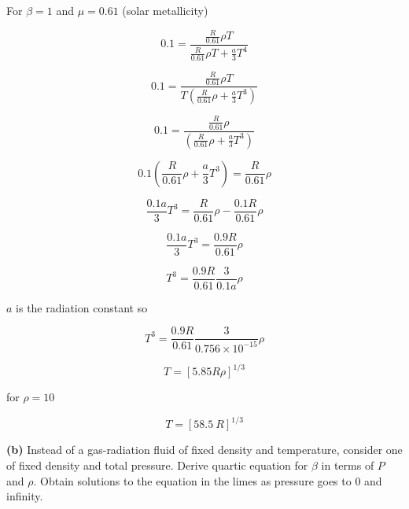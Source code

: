 \documentclass[12pt]{article}
\begin{document}
\noindent For $\beta = 1$ and $\mu = 0.61$ (solar metallicity)

\begin{equation}
0.1 =  \frac{\frac{R}{0.61}\rho T}{  \frac{R}{0.61}\rho T +   \frac{a}{3}T^4 }
\end{equation}

\begin{equation}
0.1 =  \frac{\frac{R}{0.61}\rho T}{  T\left ( \frac{R}{0.61}\rho +   \frac{a}{3}T^3 \right) }
\end{equation}

\begin{equation}
0.1 =  \frac{\frac{R}{0.61}\rho}{ \left ( \frac{R}{0.61}\rho +   \frac{a}{3}T^3 \right) }
\end{equation}


\begin{equation}
0.1 \left ( \frac{R}{0.61}\rho +   \frac{a}{3}T^3 \right)  =  \frac{R}{0.61}\rho
\end{equation}

\begin{equation}
\frac{0.1a}{3}T^3  =  \frac{R}{0.61}\rho - \frac{0.1R}{0.61}\rho
\end{equation}


\begin{equation}
\frac{0.1a}{3}T^3  =  \frac{0.9R}{0.61}\rho 
\end{equation}

\begin{equation}
T^3  =  \frac{0.9R}{0.61}\frac{3}{0.1a}\rho 
\end{equation}

\noindent $a$ is the radiation constant so 


\begin{equation}
T^3  =  \frac{0.9R}{0.61}\frac{3}{0.756 \times 10^{-15}}\rho 
\end{equation}


\begin{equation}
T =  \left[ 5.85 R\rho \right]^{1/3} 
\end{equation}

\noindent for $\rho = 10 $

\begin{equation}
T =  \left[ 58.5 ~R  \right]^{1/3} 
\end{equation}

\noindent \textbf{(b)} Instead of a gas-radiation fluid of fixed density and temperature, consider one of fixed density and total pressure. Derive quartic equation for $\beta$ in terms of $P$ and $\rho$. Obtain solutions to the equation in the limes as pressure goes to 0 and infinity.
\end{document}
